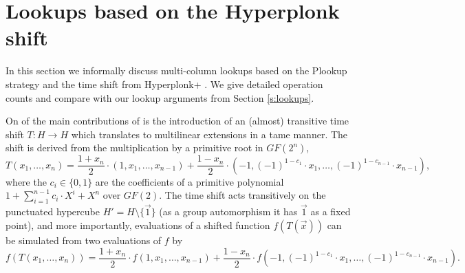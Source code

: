 \documentclass[11pt]{article}
\theoremstyle{definition}
\theoremstyle{remark}
\begin{document}

\section{Lookups based on the Hyperplonk shift}
\label{s:hyperplonk}

In this section we informally discuss multi-column lookups based on the Plookup strategy and the time shift from Hyperplonk+ \cite{Hyperplonk}. 
We  give detailed operation counts and compare with our lookup arguments from Section \ref{s:lookups}.

On of the main contributions of \cite{Hyperplonk} is the introduction of an (almost) transitive time shift $T: H\rightarrow H$ which translates to multilinear extensions in a tame manner.  
The shift is derived from the multiplication by a primitive root in $GF(2^n)$, 
\[
T(x_1, \ldots, x_n) = \frac{1 + x_n}{2} \cdot (1, x_1,\ldots, x_{n-1}) + \frac{1 - x_n }{2} \cdot (- 1,(-1)^{1 - c_1}\cdot x_1,\ldots, (-1)^{1 - c_{n - 1}}\cdot x_{n-1}),
\]  
where the $c_i\in\{0,1\}$ are the coefficients of a primitive polynomial $1 + \sum_{i=1}^{n-1} c_i\cdot X^i + X^n$ over $GF(2)$.
The time shift acts transitively on the punctuated hypercube $H' = H\setminus\{\vec 1\}$ (as a group automorphism it has $\vec 1$ as a fixed point), and more importantly, evaluations of a shifted function $f(T(\vec x))$ can be simulated from two evaluations of $f$ by
\begin{equation}
\label{e:hyperplonk:shifted:function}
f(T(x_1, \ldots, x_n)) =  \frac{1 + x_n}{2} \cdot f(1, x_1,\ldots, x_{n-1}) + \frac{1 - x_n }{2} \cdot f(- 1,(-1)^{1 - c_1}\cdot x_1,\ldots, (-1)^{1 - c_{n - 1}}\cdot x_{n-1}).
\end{equation}
\end{document}
